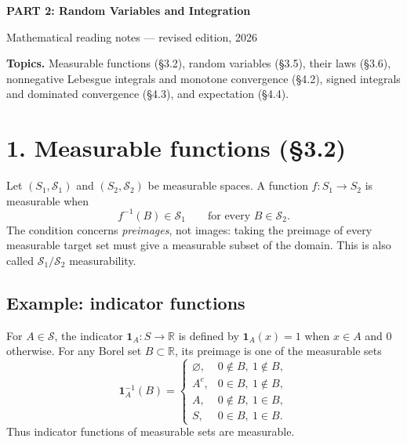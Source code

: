 \documentclass[10pt,a4paper]{article}
\newcommand{\R}{\mathbb R}\newcommand{\Q}{\mathbb Q}\newcommand{\E}{\mathbb E}\newcommand{\B}{\mathcal B}
\begin{document}
\begin{center}
{\Large\bfseries PART 2: Random Variables and Integration}\par
{\normalsize Mathematical reading notes --- revised edition, 2026}
\end{center}
\vspace{8pt}
\textbf{Topics.} Measurable functions (\S3.2), random variables (\S3.5), their laws (\S3.6), nonnegative Lebesgue integrals and monotone convergence (\S4.2), signed integrals and dominated convergence (\S4.3), and expectation (\S4.4).

\section*{1. Measurable functions (\S3.2)}
Let $(S_1,\mathcal S_1)$ and $(S_2,\mathcal S_2)$ be measurable spaces. A function $f:S_1\to S_2$ is measurable when
\[
f^{-1}(B)\in\mathcal S_1\qquad\text{for every }B\in\mathcal S_2.
\]
The condition concerns \emph{preimages}, not images: taking the preimage of every measurable target set must give a measurable subset of the domain. This is also called $\mathcal S_1/\mathcal S_2$ measurability.

\subsection*{Example: indicator functions}
For $A\in\mathcal S$, the indicator $\mathbf1_A:S\to\R$ is defined by $\mathbf1_A(x)=1$ when $x\in A$ and $0$ otherwise. For any Borel set $B\subset\R$, its preimage is one of the measurable sets
\[
\mathbf1_A^{-1}(B)=
\begin{cases}
\varnothing,&0\notin B,\ 1\notin B,\\
A^c,&0\in B,\ 1\notin B,\\
A,&0\notin B,\ 1\in B,\\
S,&0\in B,\ 1\in B.
\end{cases}
\]
Thus indicator functions of measurable sets are measurable.
\end{document}
